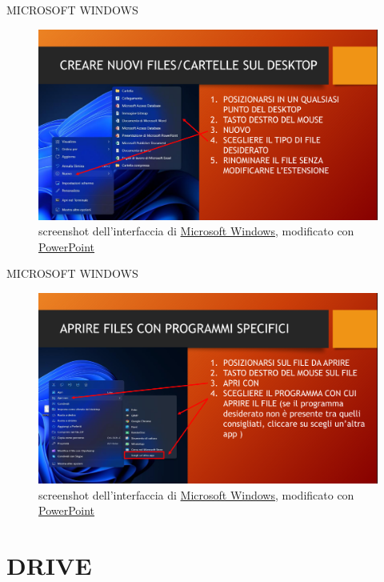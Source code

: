 \documentclass[aspectratio=1610,handout]{beamer}
\begin{document}
\begin{frame}{MICROSOFT WINDOWS}
    \begin{figure}
        \includegraphics[width=\linewidth]{img/windows13.png}
        \caption{screenshot dell'interfaccia di \href{https://www.microsoft.com/}{Microsoft Windows}, modificato con \href{https://www.microsoft.com/it-it/microsoft-365/powerpoint}{PowerPoint}}
    \end{figure}
\end{frame}

\begin{frame}{MICROSOFT WINDOWS}
    \begin{figure}
        \includegraphics[width=\linewidth]{img/windows14.png}
        \caption{screenshot dell'interfaccia di \href{https://www.microsoft.com/}{Microsoft Windows}, modificato con \href{https://www.microsoft.com/it-it/microsoft-365/powerpoint}{PowerPoint}}
    \end{figure}
\end{frame}

\section{DRIVE}
\end{document}
